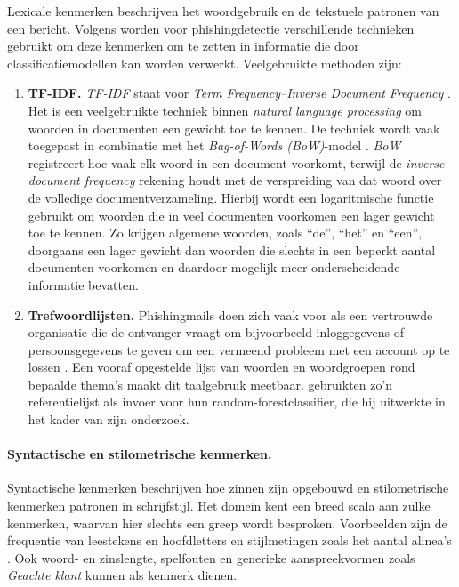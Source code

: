 Lexicale kenmerken beschrijven het woordgebruik en de tekstuele patronen van een bericht. Volgens \textcite{Salloum2022} worden voor phishingdetectie verschillende technieken gebruikt om deze kenmerken om te zetten in informatie die door classificatiemodellen kan worden verwerkt. Veelgebruikte methoden zijn:
\begin{enumerate}
    \item \textbf{TF-IDF.} \emph{TF-IDF} staat voor \emph{Term Frequency–Inverse Document Frequency} \autocite{ElKhair2009}. Het is een veelgebruikte techniek binnen \emph{natural language processing} om woorden in documenten een gewicht toe te kennen. De techniek wordt vaak toegepast in combinatie met het \emph{Bag-of-Words (BoW)}-model \autocite{Salloum2022}. \emph{BoW} registreert hoe vaak elk woord in een document voorkomt, terwijl de \emph{inverse document frequency} rekening houdt met de verspreiding van dat woord over de volledige documentverzameling. Hierbij wordt een logaritmische functie gebruikt om woorden die in veel documenten voorkomen een lager gewicht toe te kennen. Zo krijgen algemene woorden, zoals ``de'', ``het'' en ``een'', doorgaans een lager gewicht dan woorden die slechts in een beperkt aantal documenten voorkomen en daardoor mogelijk meer onderscheidende informatie bevatten.
    \item \textbf{Trefwoordlijsten.} Phishingmails doen zich vaak voor als een vertrouwde organisatie die de ontvanger vraagt om bijvoorbeeld inloggegevens of persoonsgegevens te geven om een vermeend probleem met een account op te lossen \autocite{Fette2007}. Een vooraf opgestelde lijst van woorden en woordgroepen rond bepaalde thema's maakt dit taalgebruik meetbaar. \textcite{Akinyelu2014} gebruikten zo'n referentielijst als invoer voor hun random-forestclassifier, die hij uitwerkte in het kader van zijn onderzoek.
\end{enumerate}

\paragraph{Syntactische en stilometrische kenmerken.}
\label{subsec:inhoud-taalgebruik:stilometrische-kenmerken}
Syntactische kenmerken beschrijven hoe zinnen zijn opgebouwd en stilometrische kenmerken patronen in schrijfstijl. Het domein kent een breed scala aan zulke kenmerken, waarvan hier slechts een greep wordt besproken. Voorbeelden zijn de frequentie van leestekens en hoofdletters en stijlmetingen zoals het aantal alinea's \autocite{Stringhini2014}. Ook woord- en zinslengte, spelfouten en generieke aanspreekvormen zoals \emph{Geachte klant} kunnen als kenmerk dienen.

